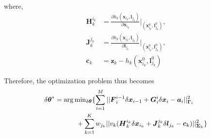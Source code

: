 where, %
\begin{equation*}
\begin{aligned}
\boldsymbol{H}_k^{i_k} &= \frac{\partial h_k(\boldsymbol{x}_{i_k}, \boldsymbol{l}_{j_k})}{\partial \boldsymbol{x}_{i_k}}|_{(\boldsymbol{x}_{i_k}^0, \boldsymbol{l}_{j_k}^0)}, \\ 
\boldsymbol{J}_k^{j_k} &= \frac{\partial h_k(\boldsymbol{x}_{i_k}, \boldsymbol{l}_{j_k})}{\partial \boldsymbol{l}_{j_k}}|_{(\boldsymbol{x}_{i_k}^0, \boldsymbol{l}_{j_k}^0)} , \\
 \boldsymbol{c}_k &= \boldsymbol{z}_k - h_k(\boldsymbol{x}_{i_k}^0, \boldsymbol{l}_{j_k}^0)
\end{aligned}
\end{equation*}


Therefore, the optimization problem thus becomes
\begin{equation}
\begin{aligned}
\delta \boldsymbol{\theta}^* = 
\operatorname*{arg\,min}&_{\delta \boldsymbol{\theta}}\{\sum_{i=1}^M||\boldsymbol{F}_i^{i-1}\delta \boldsymbol{x}_{i-1} 
+ \boldsymbol{G}_i^i\delta \boldsymbol{x}_i - \boldsymbol{a}_i||_{\boldsymbol{\Gamma}_i}^2 \\ 
&\hspace{-0.5cm}+ \sum_{k=1}^Kw_{j_k}||v_k(\boldsymbol{H}_k^{i_k}\delta \boldsymbol{x}_{i_k} 
 + \boldsymbol{J}_k^{j_k}\delta \boldsymbol{l}_{j_k} - \boldsymbol{c}_k)||_{\boldsymbol{\Sigma}_k}^2\}
\end{aligned}
\end{equation}

